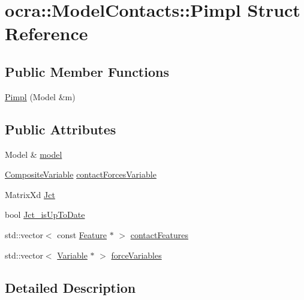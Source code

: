 \hypertarget{structocra_1_1ModelContacts_1_1Pimpl}{}\section{ocra\+:\+:Model\+Contacts\+:\+:Pimpl Struct Reference}
\label{structocra_1_1ModelContacts_1_1Pimpl}
\subsection*{Public Member Functions}
\begin{DoxyCompactItemize}
\item 
\hyperlink{structocra_1_1ModelContacts_1_1Pimpl_a49e42d553f4cb66b8c6207e63733d410}{Pimpl} (Model \&m)
\end{DoxyCompactItemize}
\subsection*{Public Attributes}
\begin{DoxyCompactItemize}
\item 
Model \& \hyperlink{structocra_1_1ModelContacts_1_1Pimpl_a16998d1fe02ccbb3a3f2282d5ddc5074}{model}
\item 
\hyperlink{classocra_1_1CompositeVariable}{Composite\+Variable} \hyperlink{structocra_1_1ModelContacts_1_1Pimpl_a274e86267cd0b9dba8105fda27fda205}{contact\+Forces\+Variable}
\item 
Matrix\+Xd \hyperlink{structocra_1_1ModelContacts_1_1Pimpl_ae11aa9cbd6a04aebd3039556c3da027b}{Jct}
\item 
bool \hyperlink{structocra_1_1ModelContacts_1_1Pimpl_ac0fa66cfb8b54718dd3a03c683819c6d}{Jct\+\_\+is\+Up\+To\+Date}
\item 
std\+::vector$<$ const \hyperlink{classocra_1_1Feature}{Feature} $\ast$ $>$ \hyperlink{structocra_1_1ModelContacts_1_1Pimpl_ac15c6469b805fa54ffb5422a7b1014bd}{contact\+Features}
\item 
std\+::vector$<$ \hyperlink{classocra_1_1Variable}{Variable} $\ast$ $>$ \hyperlink{structocra_1_1ModelContacts_1_1Pimpl_a133837a5c20241ac20b41c0fb7401682}{force\+Variables}
\end{DoxyCompactItemize}


\subsection{Detailed Description}


